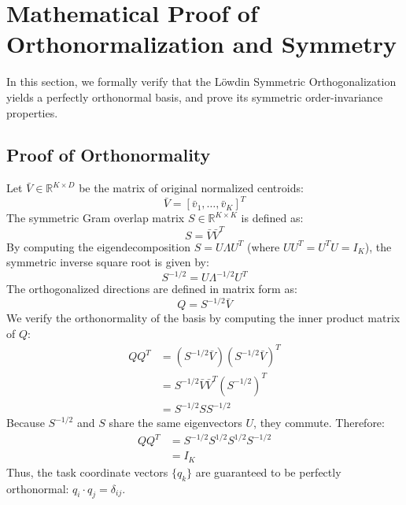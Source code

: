 \documentclass{article}
\theoremstyle{plain}
\theoremstyle{definition}
\theoremstyle{remark}
\begin{document}
\section{Mathematical Proof of Orthonormalization and Symmetry}
\label{app:proof}

In this section, we formally verify that the L{\"o}wdin Symmetric Orthogonalization yields a perfectly orthonormal basis, and prove its symmetric order-invariance properties.

\subsection{Proof of Orthonormality}
Let $\bar{V} \in \mathbb{R}^{K \times D}$ be the matrix of original normalized centroids:
\begin{equation}
\bar{V} = [\bar{v}_1, \dots, \bar{v}_K]^T
\end{equation}
The symmetric Gram overlap matrix $S \in \mathbb{R}^{K \times K}$ is defined as:
\begin{equation}
S = \bar{V} \bar{V}^T
\end{equation}
By computing the eigendecomposition $S = U \Lambda U^T$ (where $U U^T = U^T U = I_K$), the symmetric inverse square root is given by:
\begin{equation}
S^{-1/2} = U \Lambda^{-1/2} U^T
\end{equation}
The orthogonalized directions are defined in matrix form as:
\begin{equation}
Q = S^{-1/2} \bar{V}
\end{equation}
We verify the orthonormality of the basis by computing the inner product matrix of $Q$:
\begin{align}
Q Q^T &= \left( S^{-1/2} \bar{V} \right) \left( S^{-1/2} \bar{V} \right)^T \\
&= S^{-1/2} \bar{V} \bar{V}^T \left( S^{-1/2} \right)^T \\
&= S^{-1/2} S S^{-1/2}
\end{align}
Because $S^{-1/2}$ and $S$ share the same eigenvectors $U$, they commute. Therefore:
\begin{align}
Q Q^T &= S^{-1/2} S^{1/2} S^{1/2} S^{-1/2} \\
&= I_K
\end{align}
Thus, the task coordinate vectors $\{q_k\}$ are guaranteed to be perfectly orthonormal: $q_i \cdot q_j = \delta_{ij}$.
\end{document}
